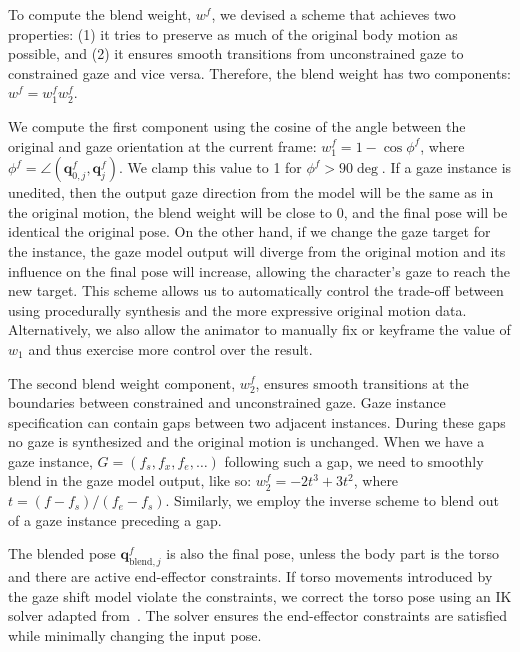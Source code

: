 To compute the blend weight, $w^f$, we devised a scheme that achieves two properties: (1) it tries to preserve as much of the original body motion as possible, and (2) it ensures smooth transitions from unconstrained gaze to constrained gaze and vice versa. Therefore, the blend weight has two components: $w^f = w_1^f w_2^f$.

We compute the first component using the cosine of the angle between the original and gaze orientation at the current frame: $w_1^f = 1 - \cos \phi^f$, where $\phi^f = \angle(\mathbf{q}_{0,j}^f, \mathbf{q}_j^f)$. We clamp this value to 1 for $\phi^f > 90 \deg$. If a gaze instance is unedited, then the output gaze direction from the model will be the same as in the original motion, the blend weight will be close to 0, and the final pose will be identical the original pose. On the other hand, if we change the gaze target for the instance, the gaze model output will diverge from the original motion and its influence on the final pose will increase, allowing the character's gaze to reach the new target. This scheme allows us to automatically control the trade-off between using procedurally synthesis and the more expressive original motion data. Alternatively, we also allow the animator to manually fix or keyframe the value of $w_1$ and thus exercise more control over the result.

The second blend weight component, $w_2^f$, ensures smooth transitions at the boundaries between constrained and unconstrained gaze. Gaze instance specification can contain gaps between two adjacent instances. During these gaps no gaze is synthesized and the original motion is unchanged. When we have a gaze instance, $G = (f_s, f_x, f_e, \ldots)$ following such a gap, we need to smoothly blend in the gaze model output, like so: $w_2^f = -2 t^3 + 3 t^2$, where $t = (f - f_s)/(f_e - f_s)$. Similarly, we employ the inverse scheme to blend out of a gaze instance preceding a gap.

The blended pose $\mathbf{q}_{\mathrm{blend},j}^f$ is also the final pose, unless the body part is the torso and there are active end-effector constraints. If torso movements introduced by the gaze shift model violate the constraints, we correct the torso pose using an IK solver adapted from~\citep{shin2001puppetry}. The solver ensures the end-effector constraints are satisfied while minimally changing the input pose. 